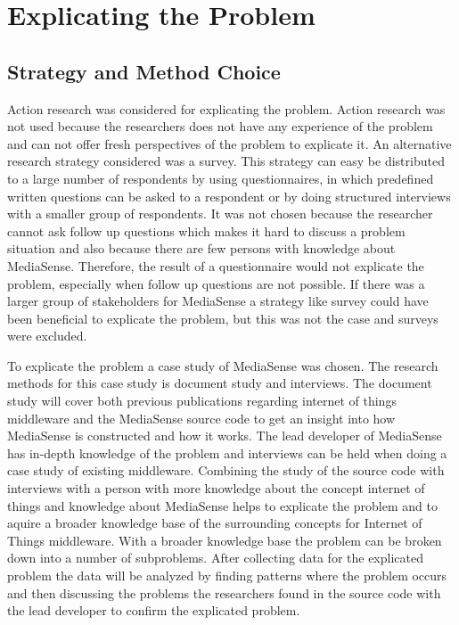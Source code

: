 \section{Explicating the Problem}
\subsection{Strategy and Method Choice}
Action research was considered for explicating the problem. Action research was not used because the researchers does not have any experience of the problem and can not offer fresh perspectives of the problem to explicate it. An alternative research strategy considered was a survey. This strategy can easy be distributed to a large number of respondents by using questionnaires, in which predefined written questions can be asked to a respondent or by doing structured interviews with a smaller group of respondents. It was not chosen because the researcher cannot ask follow up questions which makes it hard to discuss a problem situation and also because there are few persons with knowledge about MediaSense. Therefore, the result of a questionnaire would not explicate the problem, especially when follow up questions are not possible. If there was a larger group of stakeholders for MediaSense a strategy like survey could have been beneficial to explicate the problem, but this was not the case and surveys were excluded.

To explicate the problem a case study of MediaSense was chosen. The research methods for this case study is document study and interviews. The document study will cover both previous publications regarding internet of things middleware and the MediaSense source code to get an insight into how MediaSense is constructed and how it works. The lead developer of MediaSense has in-depth knowledge of the problem and interviews can be held when doing a case study of existing middleware. Combining the study of the source code with interviews with a person with more knowledge about the concept internet of things and knowledge about MediaSense helps to explicate the problem and to aquire a broader knowledge base of the surrounding concepts for Internet of Things middleware. With a broader knowledge base the problem can be broken down into a number of subproblems. After collecting data for the explicated problem the data will be analyzed by finding patterns where the problem occurs and then discussing the problems the researchers found in the source code with the lead developer to confirm the explicated problem. 

